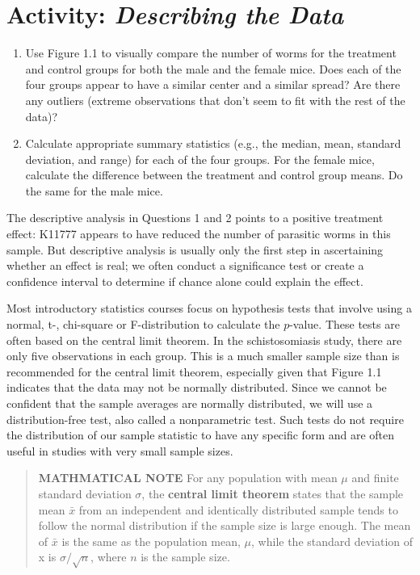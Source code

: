 \documentclass[
]{report}
\begin{document}
\hypertarget{activity-describing-the-data}{%
\section*{\texorpdfstring{Activity: \emph{Describing the Data}}{Activity: Describing the Data}}\label{activity-describing-the-data}}

\begin{enumerate}
\def\labelenumi{\arabic{enumi}.}
\item
  Use Figure 1.1 to visually compare the number of worms for the treatment and control groups for both the male and the female mice. Does each of the four groups appear to have a similar center and a similar spread? Are there any outliers (extreme observations that don't seem to fit with the rest of the data)?
\item
  Calculate appropriate summary statistics (e.g., the median, mean, standard deviation, and range) for each of the four groups. For the female mice, calculate the difference between the treatment and control group means. Do the same for the male mice.
\end{enumerate}

The descriptive analysis in Questions 1 and 2 points to a positive treatment effect: K11777 appears to have reduced the number of parasitic worms in this sample. But descriptive analysis is usually only the first step in ascertaining whether an effect is real; we often conduct a significance test or create a confidence interval to determine if chance alone could explain the effect.

Most introductory statistics courses focus on hypothesis tests that involve using a normal, t-, chi-square or F-distribution to calculate the \(p\)-value. These tests are often based on the central limit theorem. In the schistosomiasis study, there are only five observations in each group. This is a much smaller sample size
than is recommended for the central limit theorem, especially given that Figure 1.1 indicates that the data may not be normally distributed. Since we cannot be confident that the sample averages are normally distributed, we will use a distribution-free test, also called a nonparametric test. Such tests do not require
the distribution of our sample statistic to have any specific form and are often useful in studies with very
small sample sizes.

\begin{quote}
\textbf{MATHMATICAL NOTE} For any population with mean \(\mu\) and finite standard deviation \(\sigma\), the \textbf{central limit theorem} states that the sample mean \(\bar{x}\) from an independent and identically distributed sample tends to follow the normal distribution if the sample size is large enough. The mean of \(\bar{x}\) is the same as the population mean, \(\mu\), while the standard deviation of x is \(\sigma / \sqrt{n}\), where \(n\) is the sample size.
\end{quote}
\end{document}
